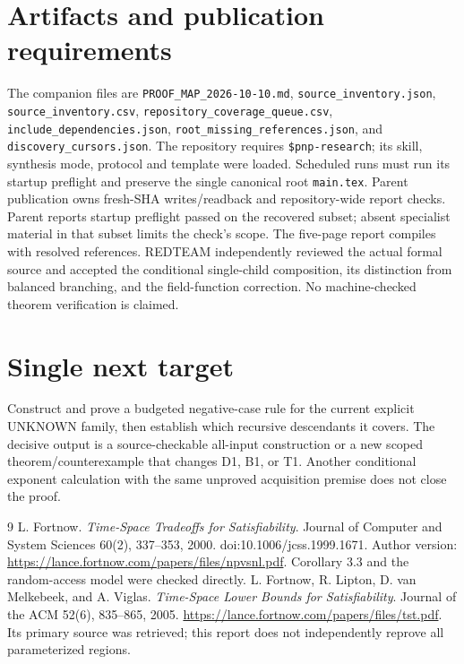 \documentclass[11pt]{article}
\begin{document}
\section*{Artifacts and publication requirements}
The companion files are \texttt{PROOF\_MAP\_2026-10-10.md},
\texttt{source\_inventory.json}, \texttt{source\_inventory.csv},
\texttt{repository\_coverage\_queue.csv},
\texttt{include\_dependencies.json},
\texttt{root\_missing\_references.json}, and
\texttt{discovery\_cursors.json}.
The repository requires \texttt{\$pnp-research}; its skill, synthesis mode,
protocol and template were loaded. Scheduled runs must run its startup
preflight and preserve the single canonical root \texttt{main.tex}.
Parent publication owns fresh-SHA writes/readback and repository-wide
report checks. Parent reports startup preflight passed on the recovered
subset; absent specialist material in that subset limits the check's scope.
The five-page report compiles with resolved references. REDTEAM independently
reviewed the actual formal source and accepted the conditional single-child
composition, its distinction from balanced branching, and the field-function
correction. No machine-checked theorem verification is claimed.

\section*{Single next target}
Construct and prove a budgeted negative-case rule for the current explicit
UNKNOWN family, then establish which recursive descendants it covers.
The decisive output is a source-checkable all-input construction or a
new scoped theorem/counterexample that changes D1, B1, or T1. Another
conditional exponent calculation with the same unproved acquisition premise
does not close the proof.

\begin{thebibliography}{9}
 L. Fortnow.
\emph{Time-Space Tradeoffs for Satisfiability}.
Journal of Computer and System Sciences 60(2), 337--353, 2000.
doi:10.1006/jcss.1999.1671.
Author version: \url{https://lance.fortnow.com/papers/files/npvsnl.pdf}.
Corollary 3.3 and the random-access model were checked directly.
 L. Fortnow, R. Lipton, D. van Melkebeek, and A. Viglas.
\emph{Time-Space Lower Bounds for Satisfiability}.
Journal of the ACM 52(6), 835--865, 2005.
\url{https://lance.fortnow.com/papers/files/tst.pdf}.
Its primary source was retrieved; this report does not independently
reprove all parameterized regions.
\end{thebibliography}
\end{document}
